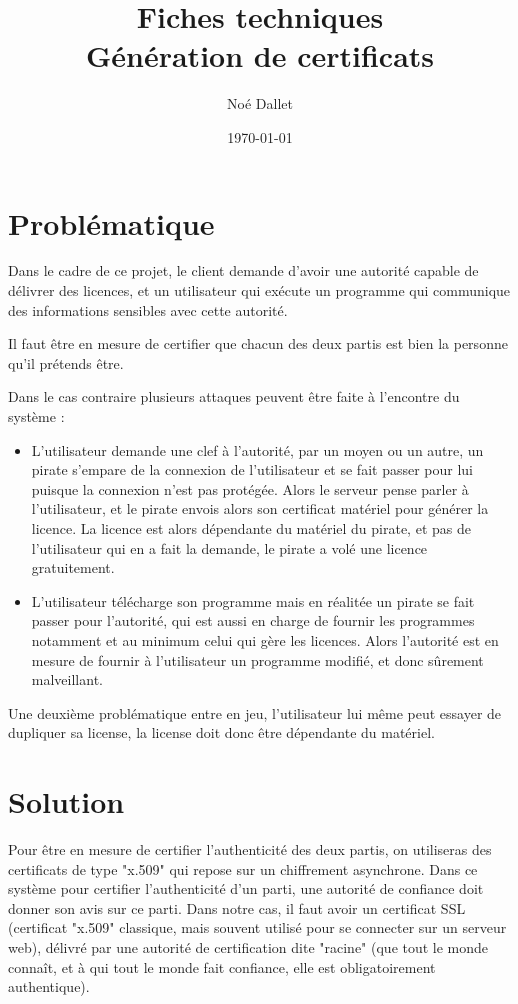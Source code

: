\documentclass{article}
\title{
    \Huge
    Fiches techniques\\
    Génération de certificats
}
\author{\huge Noé Dallet}
\date{\huge \today}
\begin{document}
\maketitle
\newpage

\section{Problématique}

Dans le cadre de ce projet, le client demande d'avoir une autorité capable de délivrer des licences, et un utilisateur qui exécute un programme qui communique des informations sensibles avec cette autorité.

Il faut être en mesure de certifier que chacun des deux partis est bien la personne qu'il prétends être.

Dans le cas contraire plusieurs attaques peuvent être faite à l'encontre du système :

\begin{itemize}
    \item L'utilisateur demande une clef à l'autorité, par un moyen ou un autre, un pirate s'empare de la connexion de l'utilisateur et se fait passer pour lui puisque la connexion n'est pas protégée. Alors le serveur pense parler à l'utilisateur, et le pirate envois alors son certificat matériel pour générer la licence. La licence est alors dépendante du matériel du pirate, et pas de l'utilisateur qui en a fait la demande, le pirate a volé une licence gratuitement.
    \item L'utilisateur télécharge son programme mais en réalitée un pirate se fait passer pour l'autorité, qui est aussi en charge de fournir les programmes notamment et au minimum celui qui gère les licences. Alors l'autorité est en mesure de fournir à l'utilisateur un programme modifié, et donc sûrement malveillant.
\end{itemize}

Une deuxième problématique entre en jeu, l'utilisateur lui même peut essayer de dupliquer sa license, la license doit donc être dépendante du matériel.


\section{Solution}

Pour être en mesure de certifier l'authenticité des deux partis, on utiliseras des certificats de type "x.509" qui repose sur un chiffrement asynchrone. Dans ce système pour certifier l'authenticité d'un parti, une autorité de confiance doit donner son avis sur ce parti. Dans notre cas, il faut avoir un certificat SSL (certificat "x.509" classique, mais souvent utilisé pour se connecter sur un serveur web), délivré par une autorité de certification dite "racine" (que tout le monde connaît, et à qui tout le monde fait confiance, elle est obligatoirement authentique). 
\end{document}
